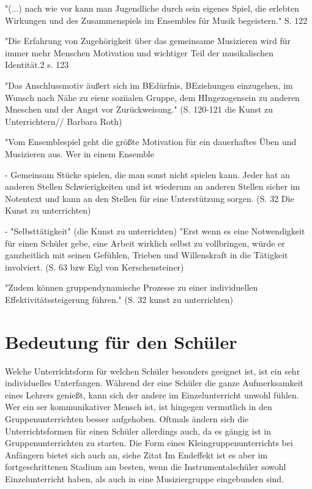 "(...) nach wie vor kann man Jugendliche durch sein eigenes Spiel, die erlebten
Wirkungen und des Zusammenspiels im Ensembles für Musik begeistern." S. 122


"Die Erfahrung von Zugehörigkeit über das gemeinsame Musizieren wird für immer
mehr Menschen Motivation und wichtiger Teil der musikalischen Identität.2 s. 123

"Das Anschlussmotiv äußert sich im BEdürfnis, BEziehungen einzugehen, im Wunsch
nach Nähe zu eienr soziialen Gruppe, dem HIngezogensein zu anderen Mneschen und
der Angst vor Zurückweisung." (S. 120-121 die Kunst zu Unterrichtern// Barbara Roth)

"Vom Ensemblespiel geht die größte Motivation für ein dauerhaftes Üben und
Musizieren aus. Wer in einem Ensemble 



- Gemeinsam Stücke spielen, die man sonst nicht spielen kann. Jeder hat an
anderen Stellen Schwierigkeiten und ist wiederum an anderen Stellen sicher im
Notentext und kann an den Stellen für eine Unterstützung sorgen. (S. 32 Die
Kunst zu unterrichten)

- "Selbsttätigkeit" (die Kunst zu unterrichten)
"Erst wenn es eine Notwendigkeit für einen Schüler gebe, eine Arbeit wirklich
selbst zu vollbringen, würde er ganzheitlich mit seinen Gefühlen, Trieben und
Willenskraft in die Tätigkeit involviert. (S. 63 bzw Eigl von Kerschensteiner)


"Zudem können gruppendynamische Prozesse zu einer individuellen
Effektivitätssteigerung führen." (S. 32 kunst zu unterrichten)

\section{Bedeutung für den Schüler}
Welche Unterrichtsform für welchen Schüler besonders geeignet ist, ist ein sehr
individuelles Unterfangen. Während der eine Schüler die ganze Aufmerksamkeit
eines Lehrers genießt, kann sich der andere im Einzelunterricht unwohl fühlen.
Wer ein ser kommunikativer Mensch ist, ist hingegen vermutlich in den
Gruppenunterrichten besser aufgehoben. Oftmals ändern sich die Unterrichtsformen
für einen Schüler allerdings auch, da es gängig ist in Gruppenunterrichten zu
starten. Die Form eines Kleingruppenunterrichts bei Anfängern bietet sich auch
an, siehe Zitat \autocite[220]{busch:grundwissen_instrumentalpaedagogik}
Im Endeffekt ist es aber im fortgeschrittenen Stadium am besten, wenn die
Instrumentalschüler sowohl Einzelunterricht haben, als auch in eine
Musiziergruppe eingebunden sind. 

